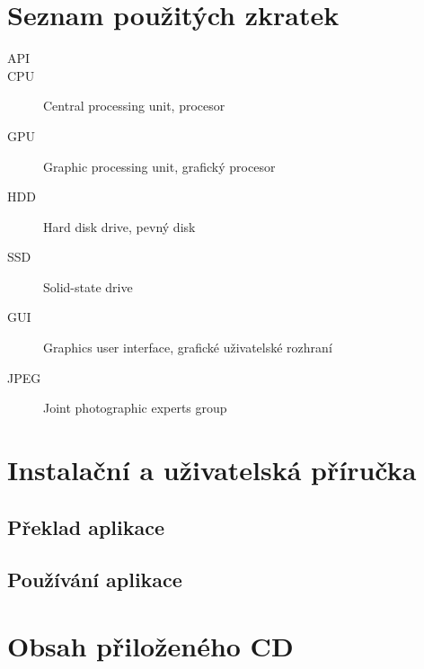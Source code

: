 \documentclass[11pt,twoside,a4paper]{book}
\begin{document}
\renewcommand\refname{Zdroje}

\def\CS{$\cal C\kern-0.1667em\lower.5ex\hbox{$\cal S$}\kern-0.075em $}



\appendix


\chapter{Seznam použitých zkratek}

\begin{description}
\item[API]
\item[CPU] Central processing unit, procesor
\item[GPU] Graphic processing unit, grafický procesor
\item[HDD] Hard disk drive, pevný disk
\item[SSD] Solid-state drive
\item[GUI] Graphics user interface, grafické uživatelské rozhraní
\item[JPEG]  Joint photographic experts group
\end{description}

\chapter{Instalační a uživatelská příručka}
\label{chap:install}

\section{Překlad aplikace}
\section{Používání aplikace}

\chapter{Obsah přiloženého CD}
\end{document}
